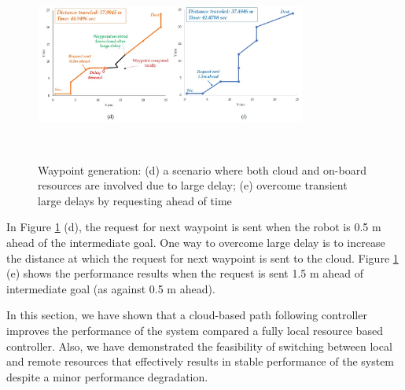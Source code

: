 \begin{figure}
\includegraphics[width=3.5in,height=2.5in]{pf_d_e.jpg}
 \caption{Waypoint generation:  (d) a scenario where both cloud and on-board resources are involved due to large delay; (e) overcome transient large delays by requesting ahead of time  \label{fig:PF_D_E}}
\end{figure}

In Figure \ref{fig:PF_D_E} (d), the request for next waypoint is sent when the robot is 0.5 m ahead of the intermediate goal. One way to overcome large delay is to increase the distance at which the request for next waypoint is sent to the cloud. Figure \ref{fig:PF_D_E} (e) shows the performance results when the request is sent 1.5 m ahead of intermediate goal (as against 0.5 m ahead).

In this section, we have shown that a cloud-based path following controller improves the performance of the system compared a fully local resource based controller. Also, we have demonstrated the feasibility of switching between local and remote resources that effectively results in stable performance of the system despite a minor performance degradation.
